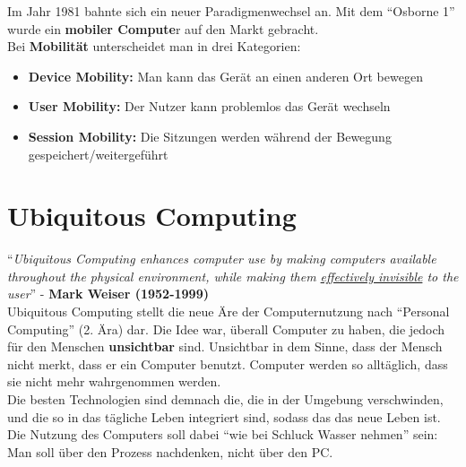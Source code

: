 \documentclass[a4paper]{article}
\begin{document}
Im Jahr 1981 bahnte sich ein neuer Paradigmenwechsel an. Mit dem ``Osborne 1'' wurde ein\textbf{ mobiler Compute}r auf den Markt gebracht.\\
Bei \textbf{Mobilität} unterscheidet man in drei Kategorien:
\begin{itemize}
	\item \textbf{Device Mobility:} Man kann das Gerät an einen anderen Ort bewegen
	\item \textbf{User Mobility:} Der Nutzer kann problemlos das Gerät wechseln
	\item \textbf{Session Mobility:} Die Sitzungen werden während der Bewegung gespeichert/weitergeführt 
\end{itemize}

\newpage
\section{Ubiquitous Computing}
``\textit{Ubiquitous Computing enhances computer use by making computers available throughout the physical environment, while making them \underline{effectively invisible} to the user}'' - \textbf{Mark Weiser (1952-1999)}\\

Ubiquitous Computing stellt die neue Äre der Computernutzung nach ``Personal Computing'' (2. Ära) dar. Die Idee war, überall Computer zu haben, die jedoch für den Menschen \textbf{unsichtbar} sind. Unsichtbar in dem Sinne, dass der Mensch nicht merkt, dass er ein Computer benutzt. Computer werden so alltäglich, dass sie nicht mehr wahrgenommen werden.\\

Die besten Technologien sind demnach die, die in der Umgebung verschwinden, und die so in das tägliche Leben integriert sind, sodass das das neue Leben ist. Die Nutzung des Computers soll dabei ``wie bei Schluck Wasser nehmen'' sein: Man soll über den Prozess nachdenken, nicht über den PC.
\end{document}
